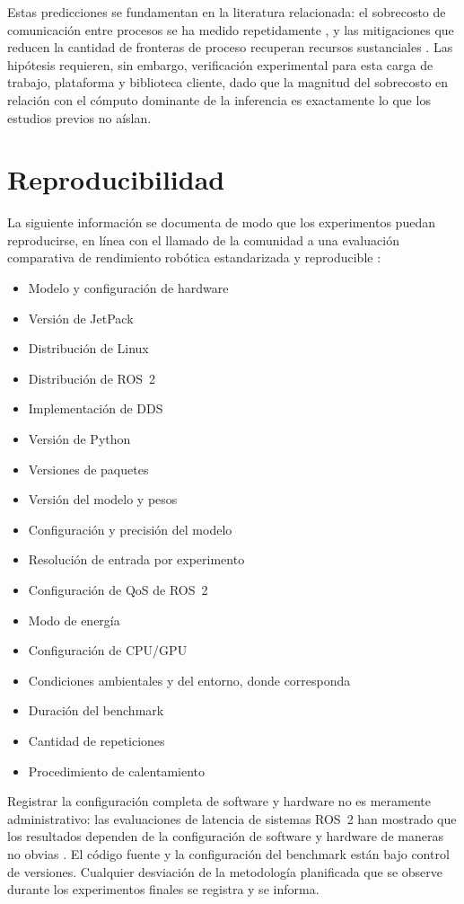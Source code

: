 Estas predicciones se fundamentan en la literatura relacionada: el
sobrecosto de comunicación entre procesos se ha medido repetidamente
\cite{kronauer2021, macenski2022, kamiya2025}, y las mitigaciones que
reducen la cantidad de fronteras de proceso recuperan recursos sustanciales
\cite{macenski2023}. Las hipótesis requieren, sin embargo, verificación
experimental para esta carga de trabajo, plataforma y biblioteca cliente,
dado que la magnitud del sobrecosto en relación con el cómputo dominante de
la inferencia es exactamente lo que los estudios previos no aíslan.

\section{Reproducibilidad}
\label{sec:reproducibility}

La siguiente información se documenta de modo que los experimentos puedan
reproducirse, en línea con el llamado de la comunidad a una evaluación
comparativa de rendimiento robótica estandarizada y reproducible
\cite{mayoral-vilches2024}:

\begin{itemize}
  \item Modelo y configuración de hardware
  \item Versión de JetPack
  \item Distribución de Linux
  \item Distribución de ROS~2
  \item Implementación de DDS
  \item Versión de Python
  \item Versiones de paquetes
  \item Versión del modelo y pesos
  \item Configuración y precisión del modelo
  \item Resolución de entrada por experimento
  \item Configuración de QoS de ROS~2
  \item Modo de energía
  \item Configuración de CPU/GPU
  \item Condiciones ambientales y del entorno, donde corresponda
  \item Duración del benchmark
  \item Cantidad de repeticiones
  \item Procedimiento de calentamiento
\end{itemize}

Registrar la configuración completa de software y hardware no es meramente
administrativo: las evaluaciones de latencia de sistemas ROS~2 han mostrado
que los resultados dependen de la configuración de software y hardware de
maneras no obvias \cite{betz2023a, kronauer2021}. El código fuente y la
configuración del benchmark están bajo control de versiones. Cualquier
desviación de la metodología planificada que se observe durante los
experimentos finales se registra y se informa.
